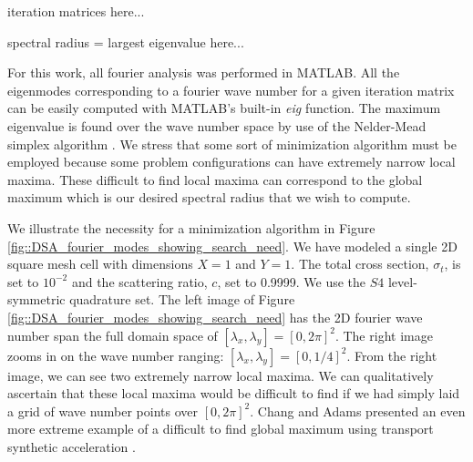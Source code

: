 iteration matrices here...

spectral radius = largest eigenvalue here...

For this work, all fourier analysis was performed in MATLAB. All the eigenmodes corresponding to a fourier wave number for a given iteration matrix can be easily computed with MATLAB's built-in {\em eig} function. The maximum eigenvalue is found over the wave number space by use of the Nelder-Mead simplex algorithm \cite{nelder1965simplex}. We stress that some sort of minimization algorithm must be employed because some problem configurations can have extremely narrow local maxima. These difficult to find local maxima can correspond to the global maximum which is our desired spectral radius that we wish to compute. 

We illustrate the necessity for a minimization algorithm in Figure \ref{fig::DSA_fourier_modes_showing_search_need}. We have modeled a single 2D square mesh cell with dimensions $X=1$ and $Y=1$. The total cross section, $\sigma_t$, is set to $10^{-2}$ and the scattering ratio, $c$, set to 0.9999. We use the $S4$ level-symmetric quadrature set. The left image of Figure \ref{fig::DSA_fourier_modes_showing_search_need} has the 2D fourier wave number span the full domain space of $[\lambda_x,\lambda_y]=[0,2 \pi]^2$. The right image zooms in on the wave number ranging: $[\lambda_x,\lambda_y]=[0,1/4]^2$. From the right image, we can see two extremely narrow local maxima. We can qualitatively ascertain that these local maxima would be difficult to find if we had simply laid a grid of wave number points over $[0,2 \pi]^2$. Chang and Adams presented an even more extreme example of a difficult to find global maximum using transport synthetic acceleration \cite{chang2003analysis}.

